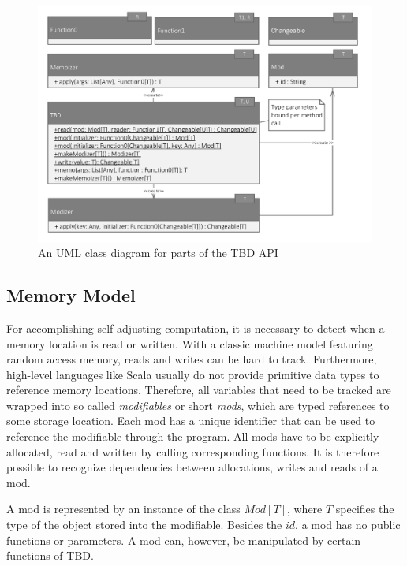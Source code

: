 \begin{figure}
\begin{center}
\includegraphics[scale=0.7]{uml/TBD.pdf}
\end{center}
\caption{An UML class diagram for parts of the TBD API}
\label{fig:tbd_uml}
\end{figure}


\subsection{Memory Model}

For accomplishing self-adjusting computation, it is necessary to detect when a memory location is read or written. With a classic machine model featuring random access memory, reads and writes can be hard to track. Furthermore, high-level languages like Scala usually do not provide primitive data types to reference memory locations. Therefore, all variables that need to be tracked are wrapped into so called \textit{modifiables} or short \textit{mods}, which are typed references to some storage location. Each mod has a unique identifier that can be used to reference the modifiable through the program. All mods have to be explicitly allocated, read and written by calling corresponding functions. It is therefore possible to recognize dependencies between allocations, writes and reads of a mod.

A mod is represented by an instance of the class $Mod[T]$, where $T$ specifies the type of the object stored into the modifiable. Besides the $id$, a mod has no public functions or parameters. A mod can, however, be manipulated by certain functions of TBD.

